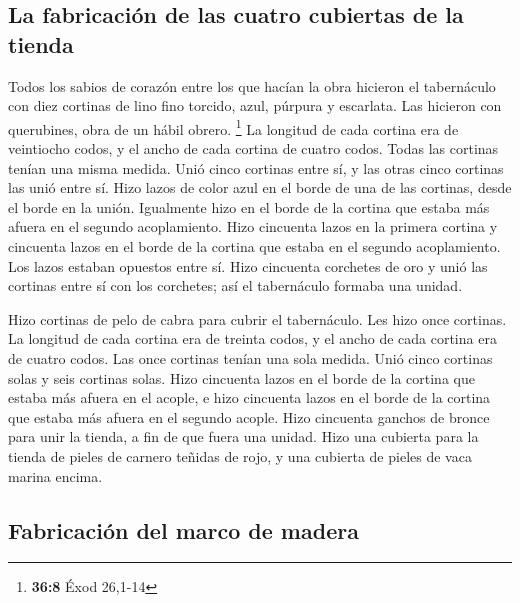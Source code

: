 \begin{paracol}{2}
\hypertarget{la-fabricaciuxf3n-de-las-cuatro-cubiertas-de-la-tienda}{%
\subsection{La fabricación de las cuatro cubiertas de la
tienda}\label{la-fabricaciuxf3n-de-las-cuatro-cubiertas-de-la-tienda}}

 Todos los sabios de corazón entre los que hacían la obra
hicieron el tabernáculo con diez cortinas de lino fino torcido, azul,
púrpura y escarlata. Las hicieron con querubines, obra de un hábil
obrero. \footnote{\textbf{36:8} Éxod 26,1-14}  La longitud
de cada cortina era de veintiocho codos, y el ancho de cada cortina de
cuatro codos. Todas las cortinas tenían una misma medida.
 Unió cinco cortinas entre sí, y las otras cinco cortinas
las unió entre sí.  Hizo lazos de color azul en el borde
de una de las cortinas, desde el borde en la unión. Igualmente hizo en
el borde de la cortina que estaba más afuera en el segundo acoplamiento.
 Hizo cincuenta lazos en la primera cortina y cincuenta
lazos en el borde de la cortina que estaba en el segundo acoplamiento.
Los lazos estaban opuestos entre sí.  Hizo cincuenta
corchetes de oro y unió las cortinas entre sí con los corchetes; así el
tabernáculo formaba una unidad.

 Hizo cortinas de pelo de cabra para cubrir el
tabernáculo. Les hizo once cortinas.  La longitud de cada
cortina era de treinta codos, y el ancho de cada cortina era de cuatro
codos. Las once cortinas tenían una sola medida.  Unió
cinco cortinas solas y seis cortinas solas.  Hizo
cincuenta lazos en el borde de la cortina que estaba más afuera en el
acople, e hizo cincuenta lazos en el borde de la cortina que estaba más
afuera en el segundo acople.  Hizo cincuenta ganchos de
bronce para unir la tienda, a fin de que fuera una unidad.
 Hizo una cubierta para la tienda de pieles de carnero
teñidas de rojo, y una cubierta de pieles de vaca marina encima.

\hypertarget{fabricaciuxf3n-del-marco-de-madera}{%
\subsection{Fabricación del marco de
madera}\label{fabricaciuxf3n-del-marco-de-madera}}


\end{paracol}
